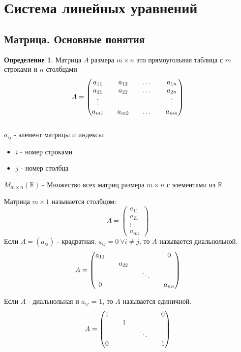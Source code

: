 \documentclass[a4paper, 12pt]{article}
\newcommand{\R}{\mathbb R}
\theoremstyle{definition}
\newtheorem*{definition}{Определение}
\begin{document}
  \section{Система линейных уравнений}
  \subsection{Матрица. Основные понятия}
  \begin{definition}
    Матрица $A$ размера $m\times n$ это прямоугольная таблица с $m$ строками и $n$ столбцами
    $$ A= \begin{pmatrix}
      a_{11} && a_{12} && \dots && a_{1n}\\
      a_{21} && a_{22} && \dots && a_{2n}\\
      \vdots && \null && \null && \vdots\\
      a_{m1} && a_{m2} && \dots && a_{mn}
    \end{pmatrix}$$ \\
    $a_{ij}$ - элемент матрицы и индексы:

    \begin{itemize}
      \item $i$ - номер строками
      \item $j$ - номер столбца
    \end{itemize}
    
    $M_{m\times n}(\R)$ - Множество всех матриц размера $m\times n$ с элементами из $\R$
    \end{definition}
    Матрица $m\times 1$ называется столбцом:
    $$ A= 
    \begin{pmatrix}
      a_{11} \\
      a_{21} \\
      \vdots \\
      a_{m1} 
    \end{pmatrix} $$
    Если $A=(a_{ij})$ - крадратная, $a_{ij} = 0\ \forall i \neq j$, то $A$ называется диальнольной.
    $$ A =
    \begin{pmatrix}
      a_{11} && \null && \null && 0 \\
      \null && a_{22} && \null && \null \\
      \null && \null && \ddots && \null \\
      0 && \null && \null && a_{nn} 
    \end{pmatrix} $$

    Если $A$ - диальнольная и $a_{ij}$ = 1, то $A$ называется единичной.
    $$ A =
    \begin{pmatrix}
      1 && \null && \null && 0 \\
      \null && 1 && \null && \null \\
      \null && \null && \ddots && \null \\
      0 && \null && \null && 1 
    \end{pmatrix} $$
\end{document}
